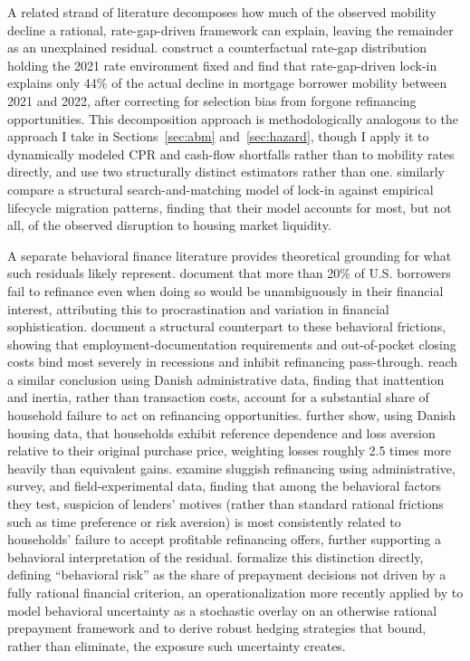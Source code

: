 \documentclass[12pt]{article}
\begin{document}
A related strand of literature decomposes how much of the observed mobility decline a rational, rate-gap-driven framework can explain, leaving the remainder as an unexplained residual. \citet{aladangady2024} construct a counterfactual rate-gap distribution holding the 2021 rate environment fixed and find that rate-gap-driven lock-in explains only 44\% of the actual decline in mortgage borrower mobility between 2021 and 2022, after correcting for selection bias from forgone refinancing opportunities. This decomposition approach is methodologically analogous to the approach I take in Sections~\ref{sec:abm} and~\ref{sec:hazard}, though I apply it to dynamically modeled CPR and cash-flow shortfalls rather than to mobility rates directly, and use two structurally distinct estimators rather than one. \citet{gerardi2024} similarly compare a structural search-and-matching model of lock-in against empirical lifecycle migration patterns, finding that their model accounts for most, but not all, of the observed disruption to housing market liquidity.

A separate behavioral finance literature provides theoretical grounding for what such residuals likely represent. \citet{keys2016} document that more than 20\% of U.S. borrowers fail to refinance even when doing so would be unambiguously in their financial interest, attributing this to procrastination and variation in financial sophistication. \citet{defusco2020} document a structural counterpart to these behavioral frictions, showing that employment-documentation requirements and out-of-pocket closing costs bind most severely in recessions and inhibit refinancing pass-through. \citet{andersen2020} reach a similar conclusion using Danish administrative data, finding that inattention and inertia, rather than transaction costs, account for a substantial share of household failure to act on refinancing opportunities. \citet{andersen2022} further show, using Danish housing data, that households exhibit reference dependence and loss aversion relative to their original purchase price, weighting losses roughly 2.5 times more heavily than equivalent gains. \citet{johnson2019} examine sluggish refinancing using administrative, survey, and field-experimental data, finding that among the behavioral factors they test, suspicion of lenders' motives (rather than standard rational frictions such as time preference or risk aversion) is most consistently related to households' failure to accept profitable refinancing offers, further supporting a behavioral interpretation of the residual. \citet{bissiri2014} formalize this distinction directly, defining ``behavioral risk'' as the share of prepayment decisions not driven by a fully rational financial criterion, an operationalization more recently applied by \citet{perotti2024} to model behavioral uncertainty as a stochastic overlay on an otherwise rational prepayment framework and to derive robust hedging strategies that bound, rather than eliminate, the exposure such uncertainty creates.
\end{document}
